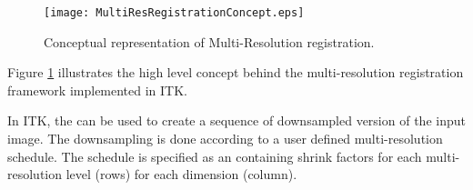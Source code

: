 


\begin{figure}
\center
\texttt{[image: MultiResRegistrationConcept.eps]}
\caption{Conceptual representation of Multi-Resolution registration.}
\label{fig:MultiResRegistrationConcept}
\end{figure}

Figure \ref{fig:MultiResRegistrationConcept} illustrates the high level concept
behind the multi-resolution registration framework implemented in ITK.



In ITK, the  can be used to create a
sequence of downsampled version of the input image.  The downsampling is done
according to a user defined multi-resolution schedule. The schedule is
specified as an  containing shrink factors for each
multi-resolution level (rows) for each dimension (column).



